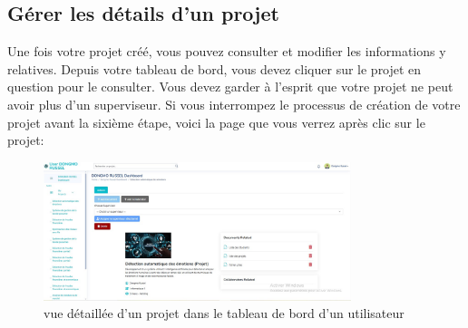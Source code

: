 \documentclass[12pt]{article}
\begin{document}
\bigskip
\subsection{Gérer les détails d'un projet}
Une fois votre projet créé, vous pouvez consulter et modifier les informations y relatives. Depuis votre tableau de bord, vous devez cliquer sur le projet en question pour le consulter. Vous devez garder à l'esprit que votre projet ne peut avoir plus d'un superviseur. Si vous interrompez le processus de création de votre projet avant la sixième étape, voici la page que vous verrez après clic sur le projet:

\begin{figure}[h!]
    \centering
    \includegraphics[width=0.8\textwidth]{./images/details-projet.jpg}
    \caption{vue détaillée d'un projet dans le tableau de bord d'un utilisateur}
    \label{fig:vue détaillée d'un projet chez un user}
\end{figure}
\end{document}
